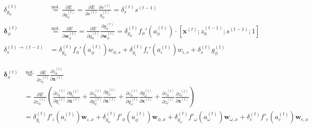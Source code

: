 \documentclass[11pt]{article}
\begin{document}
\begin{align}
    \delta_{g_{\phi}}^{(t)} &\overset{\text{not.}}{=} \displaystyle \frac{\partial E}{\partial g_{\phi}^{(t)}} = \displaystyle \frac{\partial E}{\partial s^{(t)}}  \displaystyle \frac{\partial s^{(t)}}{g_{\phi}^{(t)}} = \delta_s^{(t)} s^{(t-1)} \\
    \boldsymbol{\delta}_{\phi}^{(t)} &\overset{\text{not.}}{=} \displaystyle \frac{\partial E}{\partial \boldsymbol{w}_{\phi}^{(t)}} = \displaystyle \frac{\partial E}{\partial g_{\phi}^{(t)}} \displaystyle \frac{\partial g_{\phi}^{(t)}}{\partial \boldsymbol{w}_{\phi}^{(t)}} = \delta_{g_{\phi}}^{(t)} f_{\phi}'\left(a_{\phi}^{(t)}\right) \cdot \left[\mathbf{x}^{(t)}; z_{h}^{(t-1)}; s^{(t-1)}; 1\right] \\
    \delta^{(t) \rightarrow (t-1)}_s &= \delta_{g_{\phi}}^{(t)}f_{\phi}'\left(a_{\phi}^{(t)}\right)w_{\phi, s} +
        \delta_{g_{\iota}}^{(t)}f_{\iota}'\left(a_{\iota}^{(t)}\right)w_{\iota, s} +
        \delta_{s}^{(t)}g_{\phi}^{(t)}
\end{align}

\begin{equation}
\begin{split}
    \boldsymbol{\delta}_x^{(t)} &\overset{\text{not.}}{=} \displaystyle\frac{\partial E}{\partial z_h^{(t)}}  \displaystyle\frac{\partial z_h^{(t)}}{\partial \mathbf{x}^{(t)}} \\
    &= \displaystyle\frac{\partial E}{\partial z_h^{(t)}} \left(
            \displaystyle\frac{\partial z_h^{(t)}}{\partial g_{\iota}^{(t)}} \displaystyle\frac{\partial g_{\iota}^{(t)}}{\partial \mathbf{x}^{(t)}} +
            \displaystyle\frac{\partial z_h^{(t)}}{\partial g_{\phi}^{(t)}} \displaystyle\frac{\partial g_{\phi}^{(t)}}{\partial \mathbf{x}^{(t)}} +
            \displaystyle\frac{\partial z_h^{(t)}}{\partial g_{\omega}^{(t)}} \displaystyle\frac{\partial g_{\omega}^{(t)}}{\partial \mathbf{x}^{(t)}} +
            \displaystyle\frac{\partial z_h^{(t)}}{\partial z_{c}^{(t)}} \displaystyle\frac{\partial z_{c}^{(t)}}{\partial \mathbf{x}^{(t)}} \right)\\
            &= \delta_{g_{\iota}}^{(t)} f'_{\iota}\left(a_{\iota}^{(t)}\right) \mathbf{w}_{\iota, x} +
               \delta_{g_{\phi}}^{(t)} f'_{\phi}\left(a_{\phi}^{(t)}\right) \mathbf{w}_{\phi, x} +
               \delta_{g_{\omega}}^{(t)} f'_{\omega}\left(a_{\omega}^{(t)}\right) \mathbf{w}_{\omega, x} +
               \delta_{c}^{(t)} f'_{c}\left(a_{c}^{(t)}\right) \mathbf{w}_{c, x}
\end{split}    
\end{equation}
\end{document}

